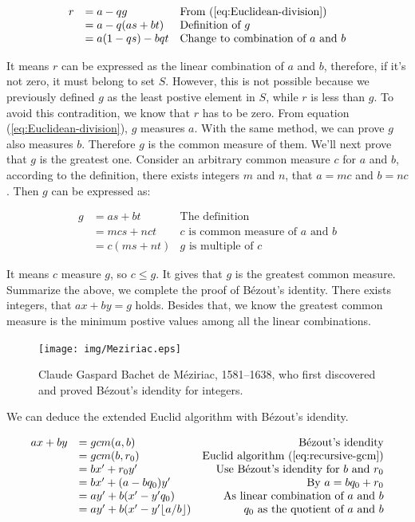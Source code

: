 \documentclass{article}
\begin{document}
\[
\begin{array}{rll}
r & = a - qg & \text{From (\ref{eq:Euclidean-division})} \\
  & = a - q(as + bt) & \text{Definition of}\ g \\
  & = a(1 - qs) - bqt & \text{Change to combination of}\ a\ \text{and}\ b
\end{array}
\]

It means $r$ can be expressed as the linear combination of $a$ and $b$, therefore, if it's not zero, it must belong to set $S$. However, this is not possible because we previously defined $g$ as the least postive element in $S$, while $r$ is less than $g$. To avoid this contradition, we know that $r$ has to be zero. From equation (\ref{eq:Euclidean-division}), $g$ measures $a$. With the same method, we can prove $g$ also measures $b$. Therefore $g$ is the common measure of them. We'll next prove that $g$ is the greatest one. Consider an arbitrary common measure $c$ for $a$ and $b$, according to the definition, there exists integers $m$ and $n$, that $a = mc$ and $b = nc$. Then $g$ can be expressed as:

\[
\begin{array}{rll}
g & = as + bt & \text{The definition} \\
  & = mcs + nct & \text{$c$ is common measure of $a$ and $b$} \\
  & = c(ms + nt) & \text{$g$ is multiple of $c$}
\end{array}
\]

It means $c$ measure $g$, so $c \leq g$. It gives that $g$ is the greatest common measure. Summarize the above, we complete the proof of Bézout's identity. There exists integers, that $ax + by = g$ holds. Besides that, we know the greatest common measure is the minimum postive values among all the linear combinations.

\begin{figure}[htbp]
 \centering
 \texttt{[image: img/Meziriac.eps]}
 \captionsetup{labelformat=empty}
 \caption{Claude Gaspard Bachet de Méziriac, 1581–1638, who first discovered and proved Bézout's idendity for integers.}
 \label{fig:Meziriac}
\end{figure}

We can deduce the extended Euclid algorithm with Bézout's idendity.

\[
\begin{array}{rlr}
ax + by & = gcm(a, b) & \text{Bézout's idendity} \\
        & = gcm(b, r_0) & \text{Euclid algorithm (\ref{eq:recursive-gcm})} \\
        & = bx' + r_0 y' & \text{Use Bézout's idendity for $b$ and $r_0$} \\
        & = bx' + (a - bq_0)y' & \text{By $a = b q_0 + r_0$} \\
        & = ay' + b(x' - y'q_0) & \text{As linear combination of $a$ and $b$} \\
        & = ay' + b(x' - y' \lfloor a / b \rfloor) & \text{$q_0$ as the quotient of $a$ and $b$}
\end{array}
\]
\end{document}
